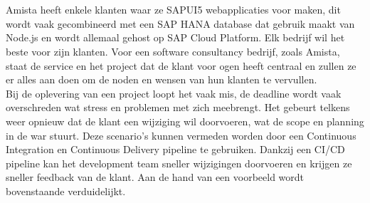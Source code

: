 %

\section{}
\label{sec:probleemstelling}

Amista heeft enkele klanten waar ze SAPUI5 webapplicaties voor maken, dit wordt vaak gecombineerd met een SAP HANA database dat gebruik maakt van Node.js en wordt allemaal gehost op SAP Cloud Platform.
Elk bedrijf wil het beste voor zijn klanten. Voor een software consultancy bedrijf, zoals Amista, staat de service en het project dat de klant voor ogen heeft centraal en zullen ze er alles aan doen om de noden en wensen van hun klanten te vervullen.\\
Bij de oplevering van een project loopt het vaak mis, de deadline wordt vaak overschreden wat stress en problemen met zich meebrengt. Het gebeurt telkens weer opnieuw dat de klant een wijziging wil doorvoeren, wat de scope en planning in de war stuurt. Deze scenario's kunnen vermeden worden door een Continuous Integration en Continuous Delivery pipeline te gebruiken. Dankzij een CI/CD pipeline kan het development team sneller wijzigingen doorvoeren en krijgen ze sneller feedback van de klant. Aan de hand van een voorbeeld wordt bovenstaande verduidelijkt.

